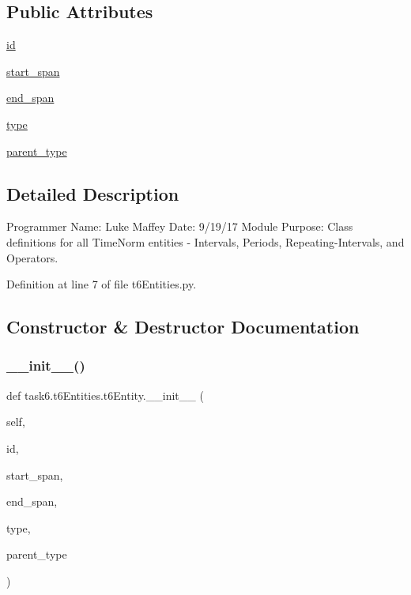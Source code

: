 \subsection*{Public Attributes}
\begin{DoxyCompactItemize}
\item 
\hyperlink{classtask6_1_1t6Entities_1_1t6Entity_a96b2e7fb553c920ab2db6f6deb31e3b4}{id}
\item 
\hyperlink{classtask6_1_1t6Entities_1_1t6Entity_a8221c36d2995a24200cdfbd74cc9233c}{start\+\_\+span}
\item 
\hyperlink{classtask6_1_1t6Entities_1_1t6Entity_a597d42bb02fc9f42277098f0ce21917c}{end\+\_\+span}
\item 
\hyperlink{classtask6_1_1t6Entities_1_1t6Entity_af0496eb852234bb168ab22d031c99ed3}{type}
\item 
\hyperlink{classtask6_1_1t6Entities_1_1t6Entity_a18ba365facb8cb062830abb11cf741f6}{parent\+\_\+type}
\end{DoxyCompactItemize}


\subsection{Detailed Description}
Programmer Name\+: Luke Maffey Date\+: 9/19/17 Module Purpose\+: Class definitions for all Time\+Norm entities -\/ Intervals, Periods, Repeating-\/\+Intervals, and Operators. 

Definition at line 7 of file t6\+Entities.\+py.



\subsection{Constructor \& Destructor Documentation}
\mbox{\label{classtask6_1_1t6Entities_1_1t6Entity_ac0bcf8dbefa28c8e1a77d891e368c9e1}} 
\subsubsection{\texorpdfstring{\+\_\+\+\_\+init\+\_\+\+\_\+()}{\_\_init\_\_()}}
{\footnotesize\ttfamily def task6.\+t6\+Entities.\+t6\+Entity.\+\_\+\+\_\+init\+\_\+\+\_\+ (\begin{DoxyParamCaption}\item[{}]{self,  }\item[{}]{id,  }\item[{}]{start\+\_\+span,  }\item[{}]{end\+\_\+span,  }\item[{}]{type,  }\item[{}]{parent\+\_\+type }\end{DoxyParamCaption})}



